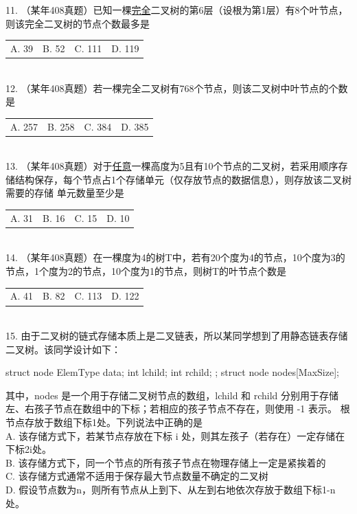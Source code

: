 11. （某年408真题）已知一棵\uline{完全}二叉树的第6层（设根为第1层）有8个叶节点，则该完全二叉树的节点个数最多是\underline{\hspace{1cm}}\\[0.3em]
\begin{tabular}{llll}
A. 39 & B. 52 & C. 111 & D. 119
\end{tabular}\\

12. （某年408真题）若一棵完全二叉树有768个节点，则该二叉树中叶节点的个数是\underline{\hspace{1cm}}\\[0.3em]
\begin{tabular}{llll}
A. 257 & B. 258 & C. 384 & D. 385
\end{tabular}\\

13. （某年408真题）对于\uline{任意}一棵高度为5且有10个节点的二叉树，若采用顺序存储结构保存，每个节点占1个存储单元（仅存放节点的数据信息），则存放该二叉树需要的存储
单元数量至少是\underline{\hspace{1cm}}\\[0.3em]
\begin{tabular}{llll}
A. 31 & B. 16 & C. 15 & D. 10
\end{tabular}\\

14. （某年408真题）在一棵度为4的树T中，若有20个度为4的节点，10个度为3的节点，1个度为2的节点，10个度为1的节点，则树T的叶节点个数是\underline{\hspace{1cm}}\\[0.5em]
\begin{tabular}{llll}
A. 41 & B. 82 & C. 113 & D. 122
\end{tabular}\\

15. 由于二叉树的链式存储本质上是二叉链表，所以某同学想到了用静态链表存储二叉树。该同学设计如下：
\begin{cppcodeNum}
struct node {
    ElemType data;
    int lchild;
    int rchild;
};
struct node nodes[MaxSize];
\end{cppcodeNum}
其中，nodes 是一个用于存储二叉树节点的数组，lchild 和 rchild 分别用于存储左、右孩子节点在数组中的下标；若相应的孩子节点不存在，则使用 -1 表示。
根节点存放于数组下标1处。下列说法中正确的是\underline{\hspace{1cm}}\\[0.5em]
A. 该存储方式下，若某节点存放在下标 i 处，则其左孩子（若存在）一定存储在下标2i处。\\
B. 该存储方式下，同一个节点的所有孩子节点在物理存储上一定是紧挨着的\\
C. 该存储方式通常不适用于保存最大节点数量不确定的二叉树\\
D. 假设节点数为n，则所有节点从上到下、从左到右地依次存放于数组下标1-n处。\\

